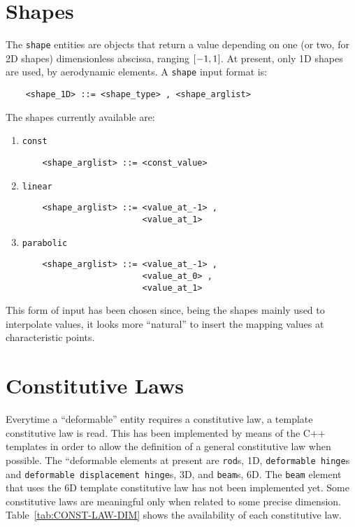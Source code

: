 \section{Shapes}
The \texttt{shape} entities are objects that return a value depending on one
(or two, for 2D shapes) dimensionless abscissa, ranging $ \left[ -1,1 \right] $.
At present, only 1D shapes are used, by aerodynamic elements.
A \texttt{shape} input format is:
\begin{verbatim}
    <shape_1D> ::= <shape_type> , <shape_arglist>
\end{verbatim}
The shapes currently available are:
\begin{enumerate}
    \item \texttt{const}
    \begin{verbatim}
    <shape_arglist> ::= <const_value>
    \end{verbatim}
    \item \texttt{linear}
    \begin{verbatim}
    <shape_arglist> ::= <value_at_-1> , 
                        <value_at_1>
    \end{verbatim}
    \item \texttt{parabolic}
    \begin{verbatim}
    <shape_arglist> ::= <value_at_-1> , 
                        <value_at_0> , 
                        <value_at_1>
    \end{verbatim}
\end{enumerate}
This form of input has been chosen since, being the shapes mainly used to
interpolate values, it looks more ``natural'' to insert the mapping values
at characteristic points.

\section{Constitutive Laws}
Everytime a ``deformable'' entity requires a constitutive law, a template
constitutive law is read. This has been implemented by means of the C++
templates in order to allow the definition of a general constitutive law
when possible. The ``deformable elements at present are \texttt{rod}s, 1D,
\texttt{deformable hinge}s and \texttt{deformable displacement hinge}s, 3D,  
and \texttt{beam}s, 6D.
The \texttt{beam} element that uses the 6D template constitutive law has not been
implemented yet.
Some constitutive laws are meaningful only when related to some precise
dimension. 
Table~\ref{tab:CONST-LAW-DIM} shows the availability of each constitutive law.

